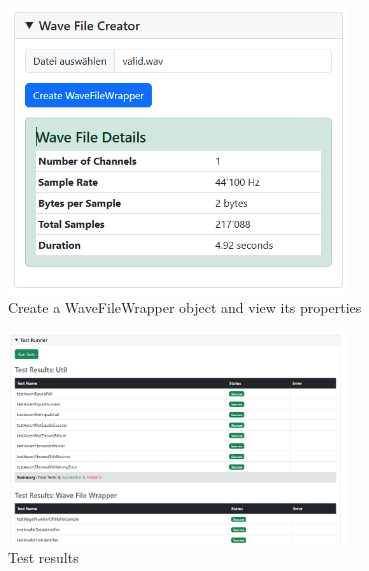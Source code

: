 \begin{figure}[H]
    \centering
    \includegraphics[width=0.8\textwidth]{../assets/wavefilecreator.png}
    \caption{Create a WaveFileWrapper object and view its properties}
\end{figure}

\begin{figure}[H]
    \centering
    \includegraphics[width=0.8\textwidth]{../assets/test_results.png}
    \caption{Test results}
\end{figure}
